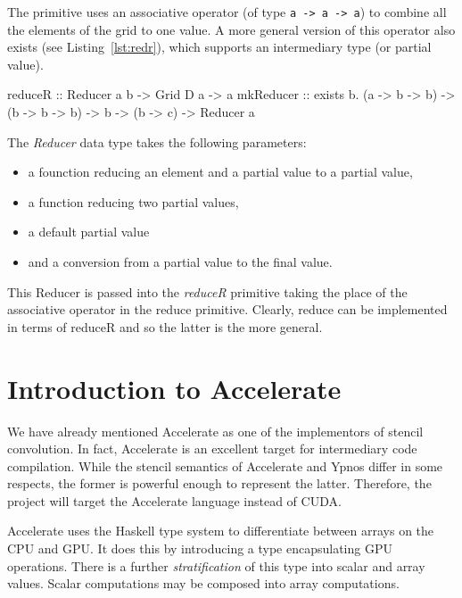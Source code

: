 \documentclass[12pt,a4paper,twoside]{scrbook}
\begin{document}
The primitive uses an associative operator (of type \texttt{a -\textgreater{} a
  -\textgreater{} a}) to combine all the elements of the grid to one value. A
more general version of this operator also exists (see Listing~\ref{lst:redr}),
which supports an intermediary type (or partial value).

\begin{hflisting}[label={lst:redr}, caption=The more general version of the
  reducer allowing for intermediary values.]
reduceR :: Reducer a b -> Grid D a -> a
mkReducer :: exists b. (a -> b -> b)
                    -> (b -> b -> b)
                    ->  b
                    -> (b -> c)
                    -> Reducer a
\end{hflisting}

The \emph{Reducer} data type takes the following parameters:

\begin{itemize}
\itemsep1pt\parskip0pt
\item
  a founction reducing an element and a partial value to a partial value,
\item
  a function reducing two partial values,
\item
  a default partial value
\item
  and a conversion from a partial value to the final value.
\end{itemize}

This Reducer is passed into the \emph{reduceR} primitive taking the place of the
associative operator in the reduce primitive. Clearly, reduce can be implemented
in terms of reduceR and so the latter is the more general.

\section{Introduction to Accelerate}

We have already mentioned Accelerate as one of the implementors of stencil
convolution. In fact, Accelerate is an excellent target for intermediary code
compilation. While the stencil semantics of Accelerate and Ypnos differ in some
respects, the former is powerful enough to represent the latter. Therefore, the
project will target the Accelerate language instead of CUDA.

Accelerate uses the Haskell type system to differentiate between arrays
on the CPU and GPU. It does this by introducing a type encapsulating GPU
operations. There is a further \emph{stratification} of this type into
scalar and array values. Scalar computations may be composed into
array computations.
\end{document}
